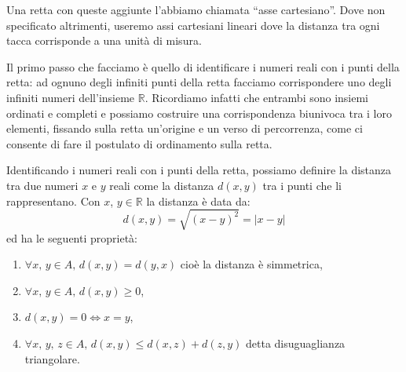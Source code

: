 \vspace{.5em}

\vspace{.5em}

Una retta con queste aggiunte l'abbiamo chiamata ``asse cartesiano''.
Dove non specificato altrimenti, useremo assi cartesiani lineari dove la 
distanza tra ogni tacca corrisponde a una unità di misura.

\vspace{.5em}

\vspace{.5em}



Il primo passo che facciamo è quello di identificare i numeri reali con i 
punti della retta: ad ognuno degli infiniti punti della retta facciamo 
corrispondere uno degli infiniti numeri dell'insieme \(\mathbb{R}\). 
Ricordiamo infatti che entrambi sono insiemi ordinati e completi e possiamo 
costruire una corrispondenza biunivoca tra i loro elementi, fissando sulla 
retta un'origine e un verso di percorrenza, come ci consente di fare il 
postulato di ordinamento sulla retta.

Identificando i numeri reali con i punti della retta, possiamo definire la 
distanza tra due numeri \(x\) e \(y\) reali come la distanza \(d(x, y)\) tra 
i punti che li rappresentano. Con \(x\), \(y\in\mathbb{R}\) la distanza è 
data da:
\begin{equation}
  d(x,y)=\sqrt{(x-y)^2}=\vert x-y\vert
\end{equation}
ed ha le seguenti proprietà:
\begin{enumerate}
  \item \(\forall x,\,y \in A,\,d(x,y)=d(y,x)\) cioè la distanza è 
simmetrica,
  \item \(\forall x,\,y \in A,\,d(x,y)\geq0\),
  \item \(d(x,y)=0\Leftrightarrow x=y\),
  \item \(\forall x,\,y,\,z \in A,\,d(x,y)\leq d(x,z)+d(z,y)\) detta 
disuguaglianza triangolare.
\end{enumerate}


